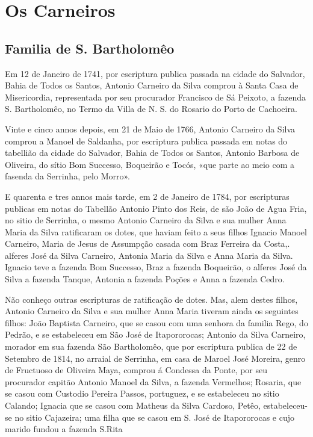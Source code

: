 \chapter{Os Carneiros}
\section*{Familia de S. Bartholomêo}

Em 12 de Janeiro de 1741, por escriptura publica passada na cidade do Salvador, Bahia de Todos os Santos, Antonio Carneiro da Silva comprou à Santa Casa de Misericordia, representada por seu procurador Francisco de Sá Peixoto, a fazenda S. Bartholomêo, no Termo da Villa de N. S. do Rosario do Porto de Cachoeira.

Vinte e cinco annos depois, em 21 de Maio de 1766, Antonio Carneiro da Silva comprou a Manoel de Saldanha, por escriptura publica passada em notas do tabellião da cidade do Salvador, Bahia de Todos os Santos, Antonio Barbosa de Oliveira, do sítio Bom Successo, Boqueirão e Tocós, «que parte ao meio com a fasenda da Serrinha, pelo Morro».

E quarenta e tres annos mais tarde, em 2 de Janeiro de 1784, por escripturas publicas em notas do Tabellão Antonio Pinto dos Reis, de são João de Agua Fria, no sitio de Serrinha, o mesmo Antonio Carneiro da Silva e sua mulher Anna Maria da Silva ratificaram os dotes, que haviam feito a seus filhos Ignacio Manoel Carneiro, Maria de Jesus de Assumpção casada com Braz Ferreira da Costa,. alferes José da Silva Carneiro, Antonia Maria da Silva e Anna Maria da Silva\label{anmsilva}. Ignacio teve a fazenda Bom Successo, Braz a fazenda Boqueirão, o alferes José da Silva a fazenda Tanque, Antonia a fazenda Poções e Anna a fazenda Cedro.

Não conheço outras escripturas de ratificação de dotes. Mas, alem destes filhos, Antonio Carneiro da Silva e sua mulher Anna Maria tiveram ainda os seguintes filhos: João Baptista Carneiro, que se casou com uma senhora da familia Rego, do Pedrão, e se estabeleceu em São José de Itapororocas; Antonio da Silva Carneiro, morador em sua fazenda São  Bartholomêo, que por escriptura publica de 22 de Setembro de 1814, no arraial de Serrinha, em casa de Maroel José Moreira, genro de Fructuoso de Oliveira Maya, comprou á Condessa da Ponte, por seu procurador capitão Antonio Manoel da Silva, a fazenda Vermelhos; Rosaria, que se casou com Custodio Pereira Passos, portuguez, e se estabeleceu no sitio Calando; Ignacia que se casou com Matheus da Silva Cardoso, Petêo, estabeleceu-se no sitio Cajazeira; uma filha que se casou em S. José de Itapororocas e cujo marido fundou a fazenda S.Rita\label{starita} %

